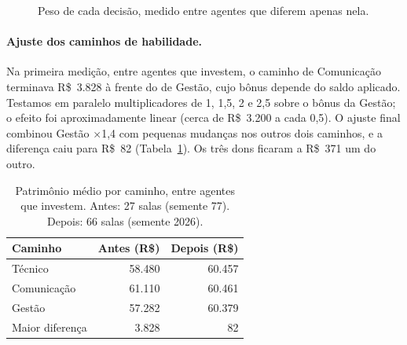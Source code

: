 \documentclass[11pt,a4paper]{article}
\begin{document}
\begin{figure}[ht]
  \centering
  \caption{Peso de cada decisão, medido entre agentes que diferem apenas nela.}
  \label{fig:peso}
\end{figure}

\paragraph{Ajuste dos caminhos de habilidade.} Na primeira medição, entre agentes que investem, o caminho de Comunicação terminava R\$~3.828 à frente do de Gestão, cujo bônus depende do saldo aplicado. Testamos em paralelo multiplicadores de 1, 1,5, 2 e 2,5 sobre o bônus da Gestão; o efeito foi aproximadamente linear (cerca de R\$~3.200 a cada 0,5). O ajuste final combinou Gestão $\times$1,4 com pequenas mudanças nos outros dois caminhos, e a diferença caiu para R\$~82 (Tabela~\ref{tab:caminhos}). Os três dons ficaram a R\$~371 um do outro.

\begin{table}[ht]
  \centering\small
  \caption{Patrimônio médio por caminho, entre agentes que investem. Antes: 27 salas (semente 77). Depois: 66 salas (semente 2026).}
  \label{tab:caminhos}
  \begin{tabular}{@{}lrr@{}}
    \toprule
    Caminho & Antes (R\$) & Depois (R\$) \\
    \midrule
    Técnico & 58.480 & 60.457 \\
    Comunicação & 61.110 & 60.461 \\
    Gestão & 57.282 & 60.379 \\
    \midrule
    Maior diferença & 3.828 & 82 \\
    \bottomrule
  \end{tabular}
\end{table}
\end{document}
